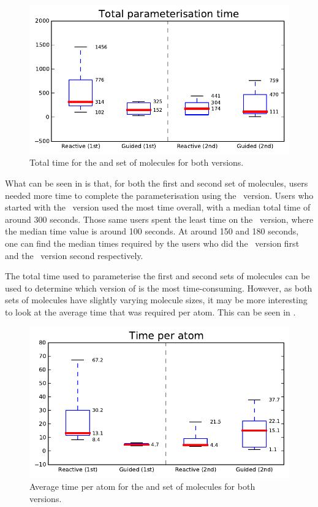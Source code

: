 \begin{figure}[h!]
\center
\includegraphics[width=.6\textwidth]{img/graphs/1a_02.pdf}
\caption{Total time for the  and  set of molecules for both versions.}
\end{figure}

What can be seen in  is that, for both the first and second set of molecules, users needed more time to complete the parameterisation using the \IDa\ version. Users who started with the \IDa\ version used the most time overall, with a median total time of around 300 seconds. Those same users spent the least time on the \IDb\ version, where the median time value is around 100 seconds. At around 150 and 180 seconds, one can find the median times required by the users who did the \IDb\ version first and the \IDa\ version second respectively.

The total time used to parameterise the first and second sets of molecules can be used to determine which version of \oframp{} is the most time-consuming. However, as both sets of molecules have slightly varying molecule sizes, it may be more interesting to look at the average time that was required per atom. This can be seen in .

\begin{figure}[h!]
\center
\includegraphics[width=.6\textwidth]{img/graphs/1a_03.pdf}
\caption{Average time per atom for the  and  set of molecules for both versions.}
\end{figure}

